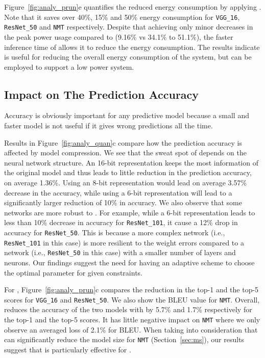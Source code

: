 Figure~\ref{fig:analy_prun}e quantifies the reduced energy consumption by applying \pruning. Note that it saves over 40\%, 15\% and 50\%
energy consumption for \texttt{VGG\_16}, \texttt{ResNet\_50} and \texttt{NMT} respectively. Despite that achieving only minor decreases in
the peak power usage compared to \quantization (9.16\% vs 34.1\% to 51.1\%), the faster inference time of \pruning allows it to reduce the
energy consumption. The results indicate \pruning is useful for reducing the overall energy consumption of the system, but \quantization
can be employed to support a low power system.

\subsection{Impact on The Prediction Accuracy}
Accuracy is obviously important for any predictive model because a small and faster model is not useful if it gives wrong predictions all
the time.


Results in Figure~\ref{fig:analy_quan}c compare how the prediction accuracy is affected by model compression. We see that the sweat spot of
\quantization depends on the neural network structure. An 16-bit representation keeps the most information of the original model and thus
leads to little reduction in the prediction accuracy, on average  1.36\%.  Using an 8-bit representation would lead on average 3.57\%
decrease in the accuracy, while using a 6-bit representation will lead to a significantly larger reduction of 10\% in  accuracy. We also
observe that some networks are more robust to \quantization. For example, while a 6-bit representation leads to less than 10\% decrease in
accuracy for \texttt{ResNet\_101}, it cause a 12\% drop in accuracy for \texttt{ResNet\_50}. This is because a more complex network (i.e.,
\texttt{ResNet\_101} in this case) is more resilient to the weight errors compared to a network (i.e., \texttt{ResNet\_50} in this case)
with a smaller number of layers and neurons. Our findings suggest the need for having an adaptive scheme to choose the optimal
\dquantization parameter for given constraints.


For \pruning, Figure~\ref{fig:analy_prun}c compares the reduction in the top-1 and the top-5 scores for \texttt{VGG\_16} and
\texttt{ResNet\_50}. We also show the BLEU value for \texttt{NMT}. Overall, \pruning reduces the accuracy of the two \CNN models with by
5.7\% and 1.7\% respectively for the top-1 and the top-5 scores. It has little negative impact on \texttt{NMT} where we only observe an
averaged loss of 2.1\% for BLEU. When taking into consideration that \pruning can significantly reduce the model size for \texttt{NMT}
(Section~\ref{sec:ms}), our results suggest that \pruning is particularly effective for \RNNs.

